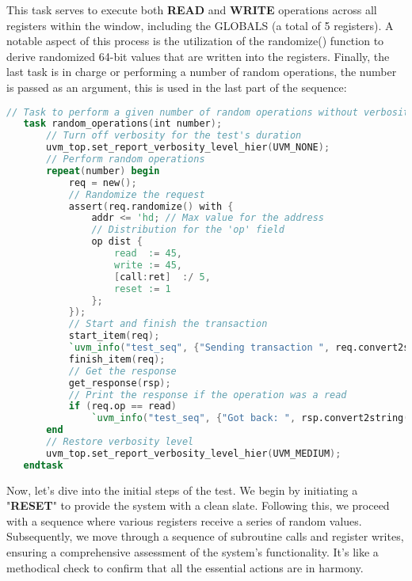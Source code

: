 \documentclass[12pt,a4paper]{report}
\begin{document}
This task serves to execute both \textbf{READ} and \textbf{WRITE} operations across all registers within the window, including the GLOBALS (a total of 5 registers). A notable aspect of this process is the utilization of the randomize() function to derive randomized 64-bit values that are written into the registers.
Finally, the last task is in charge or performing a number of random operations, the number is passed as an argument, this is used in the last part of the sequence:
\vspace{0.3cm}
\begin{lstlisting}[language=Verilog, caption= Random operation request task, label=lst:sysverilog]
// Task to perform a given number of random operations without verbosity
   task random_operations(int number);
       // Turn off verbosity for the test's duration
       uvm_top.set_report_verbosity_level_hier(UVM_NONE);
       // Perform random operations
       repeat(number) begin
           req = new();
           // Randomize the request
           assert(req.randomize() with {
               addr <= 'hd; // Max value for the address
               // Distribution for the 'op' field
               op dist {
                   read  := 45,
                   write := 45,
                   [call:ret]  :/ 5,
                   reset := 1
               };
           });
           // Start and finish the transaction
           start_item(req);
           `uvm_info("test_seq", {"Sending transaction ", req.convert2string()}, UVM_HIGH);
           finish_item(req);
           // Get the response        
           get_response(rsp);      
           // Print the response if the operation was a read
           if (req.op == read)
               `uvm_info("test_seq", {"Got back: ", rsp.convert2string()}, UVM_HIGH);
       end
       // Restore verbosity level
       uvm_top.set_report_verbosity_level_hier(UVM_MEDIUM);
   endtask
\end{lstlisting}
\vspace{0.7cm}
Now, let's dive into the initial steps of the test. We begin by initiating a "\textbf{RESET}" to provide the system with a clean slate. Following this, we proceed with a sequence where various registers receive a series of random values. Subsequently, we move through a sequence of subroutine calls and register writes, ensuring a comprehensive assessment of the system's functionality. It's like a methodical check to confirm that all the essential actions are in harmony.
\vspace{0.3cm}
\end{document}
